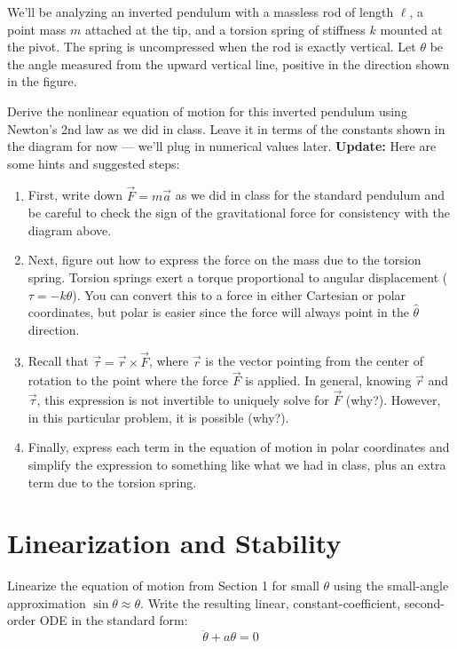 \documentclass[11pt,letterpaper]{article}
\begin{document}
\noindent We'll be analyzing an inverted pendulum with a massless rod of length $\ell$, a point mass $m$ attached at the tip, and a torsion spring of stiffness $k$ mounted at the pivot. The spring is uncompressed when the rod is exactly vertical. Let $\theta$ be the angle measured from the upward vertical line, positive in the direction shown in the figure.

Derive the nonlinear equation of motion for this inverted pendulum using Newton's 2nd law as we did in class. Leave it in terms of the constants shown in the diagram for now --- we'll plug in numerical values later. \textbf{Update:} Here are some hints and suggested steps:

\begin{enumerate}[label=(\alph*)]
\item First, write down $\vec{F}=m\vec{a}$ as we did in class for the standard pendulum and be careful to check the sign of the gravitational force for consistency with the diagram above.
\item Next, figure out how to express the force on the mass due to the torsion spring. Torsion springs exert a torque proportional to angular displacement ($\tau = -k \theta$). You can convert this to a force in either Cartesian or polar coordinates, but polar is easier since the force will always point in the $\hat{\theta}$ direction.
\item Recall that $\vec{\tau} = \vec{r} \times \vec{F}$, where $\vec{r}$ is the vector pointing from the center of rotation to the point where the force $\vec{F}$ is applied. In general, knowing $\vec{r}$ and $\vec{\tau}$, this expression is not invertible to uniquely solve for $\vec{F}$ (why?). However, in this particular problem, it is possible (why?).
\item Finally, express each term in the equation of motion in polar coordinates and simplify the expression to something like what we had in class, plus an extra term due to the torsion spring.
\end{enumerate}


\section{Linearization and Stability}

Linearize the equation of motion from Section 1 for small $\theta$ using the small-angle approximation $\sin\theta \approx \theta$. Write the resulting linear, constant-coefficient, second-order ODE in the standard form:
\[
\ddot\theta + a \theta = 0
\]
\end{document}
